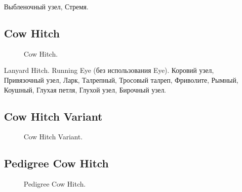 Выбленочный узел, Стремя.

\subsection{Cow Hitch}

\begin{figure}[H]\centering
	\begin{minipage}{1\linewidth}
		\begin{center}
			\tcbox[enhanced jigsaw,colframe=black,opacityframe=0.5,opacityback=0.5]
			{\centering{}}
		\end{center}
	\end{minipage}
\caption{Cow Hitch.}
\label{ris:Cow_Hitch}
\end{figure}

Lanyard Hitch. Running Eye (без использования Eye). Коровий узел, Привязочный узел, Ларк, Талрепный, Тросовый талреп, Фриволите, Рымный, Коушный, Глухая петля, Глухой узел, Бирочный узел.

\subsection{Cow Hitch Variant}

\begin{figure}[H]\centering
	\begin{minipage}{1\linewidth}
		\begin{center}
			\tcbox[enhanced jigsaw,colframe=black,opacityframe=0.5,opacityback=0.5]
			{\centering{}}
		\end{center}
	\end{minipage}
\caption{Cow Hitch Variant.}
\label{ris:Cow_Hitch_Variant}
\end{figure}

\subsection{Pedigree Cow Hitch}

\begin{figure}[H]\centering
	\begin{minipage}{1\linewidth}
		\begin{center}
			\tcbox[enhanced jigsaw,colframe=black,opacityframe=0.5,opacityback=0.5]
			{\centering{}}
		\end{center}
	\end{minipage}
\caption{Pedigree Cow Hitch.}
\label{ris:Pedigree_Cow_Hitch}
\end{figure}

